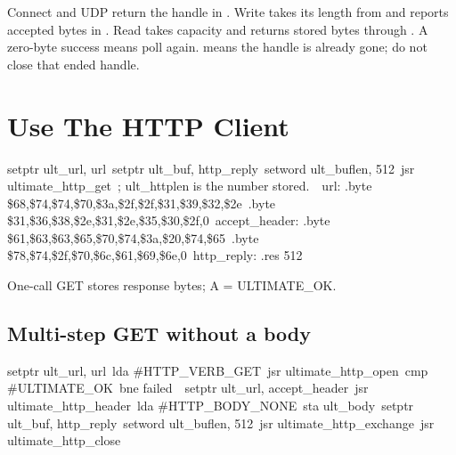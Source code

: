 Connect and UDP return the handle in . Write takes its length
from  and reports accepted bytes in . Read
takes capacity and returns stored bytes through . A zero-byte
success means poll again.  means the handle is already gone;
do not close that ended handle.


\section{Use The HTTP Client}

\begin{listingbox}
\hspace*{2em}setptr ult\_url, url\
\hspace*{2em}setptr ult\_buf, http\_reply\
\hspace*{2em}setword ult\_buflen, 512\
\hspace*{2em}jsr ultimate\_http\_get\
\hspace*{2em}; ult\_httplen is the number stored.\
\
url:           .byte \$68,\$74,\$74,\$70,\$3a,\$2f,\$2f,\$31,\$39,\$32,\$2e\
\hspace*{9em}.byte \$31,\$36,\$38,\$2e,\$31,\$2e,\$35,\$30,\$2f,0\
accept\_header: .byte \$61,\$63,\$63,\$65,\$70,\$74,\$3a,\$20,\$74,\$65\
\hspace*{9em}.byte \$78,\$74,\$2f,\$70,\$6c,\$61,\$69,\$6e,0\
http\_reply:    .res 512
\end{listingbox}

\begin{resultbox}
One-call GET stores response bytes; A = ULTIMATE_OK.
\end{resultbox}

\Needspace{26\baselineskip}
\subsection*{Multi-step GET without a body}

\begin{listingbox}
\hspace*{2em}setptr ult\_url, url\
\hspace*{2em}lda \#HTTP\_VERB\_GET\
\hspace*{2em}jsr ultimate\_http\_open\
\hspace*{2em}cmp \#ULTIMATE\_OK\
\hspace*{2em}bne failed\
\
\hspace*{2em}setptr ult\_url, accept\_header\
\hspace*{2em}jsr ultimate\_http\_header\
\hspace*{2em}lda \#HTTP\_BODY\_NONE\
\hspace*{2em}sta ult\_body\
\hspace*{2em}setptr ult\_buf, http\_reply\
\hspace*{2em}setword ult\_buflen, 512\
\hspace*{2em}jsr ultimate\_http\_exchange\
\hspace*{2em}jsr ultimate\_http\_close\
\
\end{listingbox}

